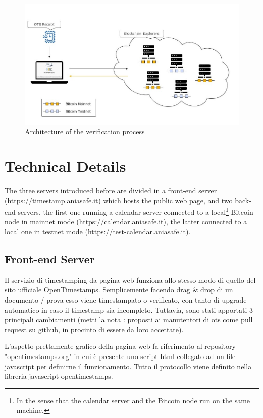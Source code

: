 \bigskip
\begin{figure}[!htb]
    \centering
	\includegraphics[width=1\linewidth]{Images/project-verifying.jpg}
	\caption{Architecture of the verification process}
	\label{fig:ots-project-verifying}
\end{figure}

\bigskip
\section{Technical Details}
The three servers introduced before are divided in a front-end server (\url{https://timestamp.aniasafe.it}) which hosts the public web page, and two back-end servers, the first one running a calendar server connected to a local\footnote{In the sense that the calendar server and the Bitcoin node run on the same machine.} Bitcoin node in mainnet mode (\url{https://calendar.aniasafe.it}), the latter connected to a local one in testnet mode (\url{https://test-calendar.aniasafe.it}).

\subsection{Front-end Server}
Il servizio di timestamping da pagina web funziona allo stesso modo di quello del sito ufficiale OpenTimestamps. Semplicemente facendo drag \& drop di un documento / prova esso viene timestampato o verificato, con tanto di upgrade automatico in caso il timestamp sia incompleto. Tuttavia, sono stati apportati 3 principali cambiamenti (metti la nota :  proposti ai manutentori di ots come pull request su github, in procinto di essere da loro accettate).  



L'aspetto prettamente grafico della pagina web fa riferimento al repository "opentimestamps.org" in cui è presente uno script html collegato ad un file javascript per definirne il funzionamento. Tutto il protocollo viene definito nella libreria javascript-opentimestamps.